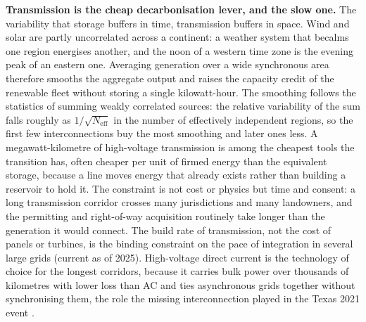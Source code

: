 \begin{mastery}
\textbf{Transmission is the cheap decarbonisation lever, and the slow one.}
The variability that storage buffers in time, transmission buffers in
space. Wind and solar are partly uncorrelated across a continent: a
weather system that becalms one region energises another, and the noon of
a western time zone is the evening peak of an eastern one. Averaging
generation over a wide synchronous area therefore smooths the aggregate
output and raises the capacity credit of the renewable fleet without
storing a single kilowatt-hour. The smoothing follows the statistics of
summing weakly correlated sources: the relative variability of the sum
falls roughly as $1/\sqrt{N_{\text{eff}}}$ in the number of effectively
independent regions, so the first few interconnections buy the most
smoothing and later ones less. A megawatt-kilometre of high-voltage
transmission is among the cheapest tools the transition has, often cheaper
per unit of firmed energy than the equivalent storage, because a line moves
energy that already exists rather than building a reservoir to hold it.
The constraint is not cost or physics but time and consent: a long
transmission corridor crosses many jurisdictions and many landowners, and
the permitting and right-of-way acquisition routinely take longer than the
generation it would connect. The build rate of transmission, not the cost
of panels or turbines, is the binding constraint on the pace of integration
in several large grids (current as of 2025). High-voltage direct current
is the technology of choice for the longest corridors, because it carries
bulk power over thousands of kilometres with lower loss than AC and ties
asynchronous grids together without synchronising them, the role the
missing interconnection played in the Texas 2021 event
\cite{acc:ferc-nerc-texas-2021}.
\end{mastery}

